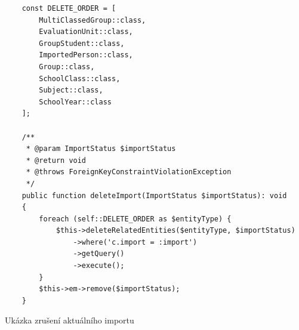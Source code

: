 \begin{code}[H]

  \begin{verbatim}
    const DELETE_ORDER = [
        MultiClassedGroup::class,
        EvaluationUnit::class,
        GroupStudent::class,
        ImportedPerson::class,
        Group::class,
        SchoolClass::class,
        Subject::class,
        SchoolYear::class
    ];

    /**
     * @param ImportStatus $importStatus
     * @return void
     * @throws ForeignKeyConstraintViolationException
     */
    public function deleteImport(ImportStatus $importStatus): void
    {
        foreach (self::DELETE_ORDER as $entityType) {
            $this->deleteRelatedEntities($entityType, $importStatus)
                ->where('c.import = :import')
                ->getQuery()
                ->execute();
        }
        $this->em->remove($importStatus);
    }
  \end{verbatim}
  
  \caption{Ukázka zrušení aktuálního importu}

\end{code}
